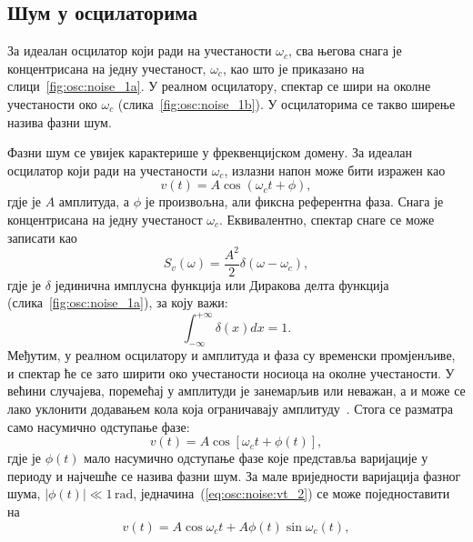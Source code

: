 \documentclass[master]{finthesis}
\begin{document}
\subsection{Шум у осцилаторима} \label{section:osc:noise}
За идеалан осцилатор који ради на учестаности $\omega_{c}$, сва његова снага је концентрисана на једну учестаност, $\omega_{c}$, као што је приказано на слици~\ref{fig:osc:noise_1a}. У реалном осцилатору, спектар се шири на околне учестаности око $\omega_{c}$ (слика~\ref{fig:osc:noise_1b}). У осцилаторима се такво ширење назива фазни шум. \par

Фазни шум се увијек карактерише у фреквенцијском домену. За идеалан осцилатор који ради на учестаности $\omega_{c}$, излазни напон може бити изражен као
\begin{equation}
	\label{eq:osc:noise:vt_1}
	v(t) = A\cos(\omega_{c}t + \phi),
\end{equation}
гдје је $A$ амплитуда, а $\phi$ је произвољна, али фиксна референтна фаза. Снага је концентрисана на једну учестаност $\omega_{c}$. Еквивалентно, спектар снаге се може записати као
\begin{equation}
	\label{eq:osc:noise:sv_1}
	S_{v}(\omega) = \frac{A^{2}}{2}\delta (\omega - \omega_{c}),
\end{equation}
гдје је $\delta$ јединична имплусна функција или Диракова делта функција (слика~\ref{fig:osc:noise_1a}), за коју важи:
\begin{equation}
	\label{eq:osc:noise:dirac}
	\int_{-\infty}^{+\infty}\delta(x)dx=1.
\end{equation}
Међутим, у реалном осцилатору и амплитуда и фаза су временски промјенљиве, и спектар ће се зато ширити око учестаности носиоца на околне учестаности. У већини случајева, поремећај у амплитуди је занемарљив или неважан, а и може се лако уклонити додавањем кола која ограничавају амплитуду~\cite{Staszewski:FREQUENCY_SYNTHESIZER_CMOS_2005}. Стога се разматра само насумично одступање фазе:
\begin{equation}
	\label{eq:osc:noise:vt_2}
	v(t) = A\cos[\omega_{c}t + \phi (t)],
\end{equation}
гдје је $\phi (t)$ мало насумично одступање фазе које представља варијације у периоду и најчешће се назива фазни шум. За мале вриједности варијација фазног шума, $|\phi (t)| \ll 1\,\text{rad}$, једначина~(\ref{eq:osc:noise:vt_2}) се може поједноставити на
\begin{equation}
	\label{eq:osc:noise:vt_3}
	v(t) = A\cos\omega_{c}t + A\phi (t)\sin\omega_{c}(t),
\end{equation}
\end{document}
